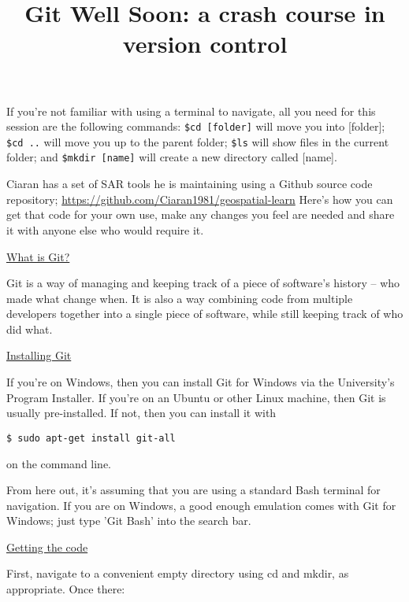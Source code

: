 \documentclass[11pt, a4paper, english]{article}
\newenvironment{wrapbox}
	{
		\begin{tcolorbox}
	}
	{
		\end{tcolorbox}
	}
\begin{document}
\title{Git Well Soon: a crash course in version control}

\maketitle

\begin{wrapbox}
If you're not familiar with using a terminal to navigate, all you need for this session are the following commands: \verb|$cd [folder]| will move you into [folder]; \verb|$cd ..| will move you up to the parent folder; \verb|$ls| will show files in the current folder; and \verb|$mkdir [name]| will create a new directory called [name].
\end{wrapbox}

Ciaran has a set of SAR tools he is maintaining using a Github source code repository; \url{https://github.com/Ciaran1981/geospatial-learn} Here's how you can get that code for your own use, make any changes you feel are needed and share it with anyone else who would require it.

\underline{What is Git?}

Git is a way of managing and keeping track of a piece of software's history -- who made what change when. It is also a way combining code from multiple developers together into a single piece of software, while still keeping track of who did what.



\underline{Installing Git}

If you're on Windows, then you can install Git for Windows via the University's Program Installer. If you're on an Ubuntu or other Linux machine, then Git is usually pre-installed. If not, then you can install it with

\begin{verbatim}
$ sudo apt-get install git-all
\end{verbatim}

on the command line.

\begin{wrapbox}
From here out, it's assuming that you are using a standard Bash terminal for navigation. If you are on Windows, a good enough emulation comes with Git for Windows; just type 'Git Bash' into the search bar.
\end{wrapbox}

\underline{Getting the code}

First, navigate to a convenient empty directory using cd and mkdir, as appropriate. Once there:
\end{document}
